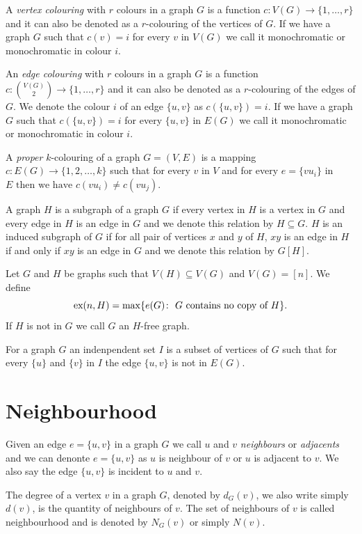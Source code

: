 \documentclass[12pt,twoside,a4paper,bibliography=totocnumbered]{book}
\numberwithin{equation}{section}
\theoremstyle{remark}
\def\ex{\mathop{\text{\rm ex}}\nolimits}
\begin{document}
A {\it vertex colouring} with $r$ colours in a graph $G$ is a function $c\colon V(G) \rightarrow \{1,\ldots,r\}$ and it can also be denoted as a $r$-colouring of the vertices of $G$. If we have a graph $G$ such that $c(v)=i$ for every $v$ in $V(G)$ we call it monochromatic or monochromatic in colour $i$.


An {\it edge colouring} with $r$ colours in a graph $G$ is a function $c\colon \binom{V(G)}{2} \rightarrow \{1,\ldots,r\}$ and it can also be denoted as a $r$-colouring of the edges of $G$. We denote the colour $i$ of an edge $\{u,v\}$ as $c(\{u,v\})=i$. If we have a graph $G$ such that $c(\{u,v\})=i$ for every $\{u,v\}$ in $E(G)$ we call it monochromatic or monochromatic in colour $i$.

A {\it proper} $k$-colouring of a graph $G=(V,E)$ is a mapping $c\colon E(G) \rightarrow \{1,2,
\ldots,k\}$ such that for every $v$ in $V$ and for every $e =\{vu_i\}$ in $E \text{ then we have } c(vu_i) \neq c(vu_j)$.

A graph $H$ is a subgraph of a graph $G$ if every vertex in $H$ is a vertex in $G$ and every edge in $H$ is an edge in $G$ and we denote this relation by $H \subseteq G$. $H$ is an induced subgraph of $G$ if for all pair of vertices $x$ and $y$ of $H$, $xy$ is an edge in $H$ if and only if $xy$ is an edge in $G$ and we denote this relation by $G[H]$.

Let $G$ and $H$ be graphs such that $V(H) \subseteq V(G)$ and $V(G)= [n]$. We define $$\ex(n,H) = \max\{e(G)\colon\text{ $G$ contains no copy of $H$}\}.$$ If $H$ is not in $G$ we call $G$ an $H$-free graph.

For a graph $G$ an indenpendent set $I$ is a subset of vertices of $G$ such that for every $\{u\}$ and $\{v\}$ in $I$ the edge $\{u,v\}$ is not in $E(G)$.

\section{Neighbourhood}
Given an edge $e =\{u,v\}$ in a graph $G$ we call $u$ and $v$ {\it neighbours} or {\it adjacents} and we can denonte $e =\{u,v\}$ as $u$ is neighbour of $v$ or $u$ is adjacent to $v$. We also say the edge $\{u,v\}$ is incident to $u$ and $v$.

The degree of a vertex $v$ in a graph $G$, denoted by $d_G(v)$, we also write simply $d(v)$, is the quantity of neighbours of $v$. The set of neighbours of $v$ is called neighbourhood and is denoted by $N_G(v)$ or simply $N(v)$.
\end{document}

